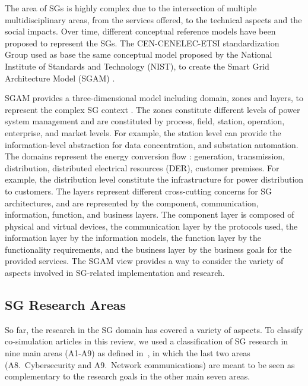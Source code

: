 \documentclass[1p]{elsarticle} %
\begin{document}
The area of SGs is highly complex due to the intersection of multiple multidisciplinary areas, from the services offered, to the technical aspects and the social impacts. Over time, different conceptual reference models have been proposed to represent the SGs. The CEN-CENELEC-ETSI standardization Group used as base the same conceptual model proposed by the National Institute of Standards and Technology (NIST), to create the Smart Grid Architecture Model (SGAM) \citep{ref:bruin2012sgam}.


SGAM provides a three-dimensional model including domain, zones and layers, to represent the complex SG context \citep{ref:bruin2012sgam}. The zones constitute different levels of power system management and are constituted by process, field, station, operation, enterprise, and market levels. For example, the station level can provide the information-level abstraction for data concentration, and substation automation.
The domains represent the energy conversion flow \citep{ref:bruin2012sgam}: generation, transmission, distribution, distributed electrical resources (DER), customer premises. For example, the distribution level constitute the infrastructure for power distribution to customers.  
The layers represent different cross-cutting concerns for SG architectures, and are represented by the component, communication, information, function, and business layers. The component layer is composed of physical and virtual devices, the communication layer by the protocols used, the information layer by the information models, the function layer by the functionality requirements, and the business layer by the business goals for the provided services. The SGAM view provides a way to consider the variety of aspects involved in SG-related implementation and research.

\subsection{SG Research Areas}
\label{sec:research-areas}

So far, the research in the SG domain has covered a variety of aspects. To classify co-simulation articles in this review, we used a classification of SG research in nine main areas (A1-A9) as defined in~\citet{ref:cintuglu2017survey}, in which the last two areas (A8.~Cybersecurity and A9.~Network communications) are meant to be seen as complementary to the research goals in the other main seven areas.
\end{document}
